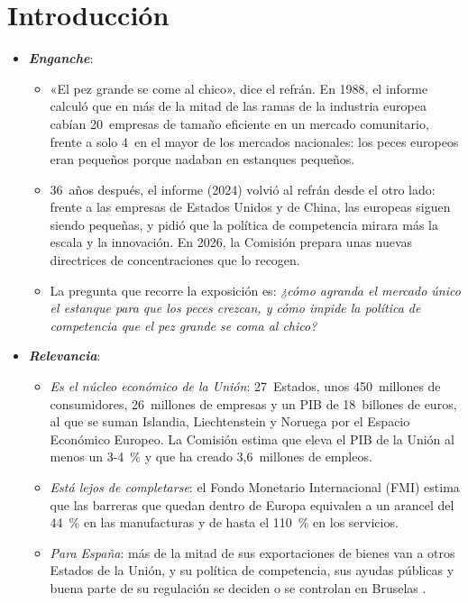 \documentclass[11pt]{article}
\begin{document}
\tceetitulo

\section*{Introducción}

\begin{itemize}
\item \textbf{\emph{Enganche}}:
  \begin{itemize}
  \item «El pez grande se come al chico», dice el refrán. En 1988, el informe  calculó que en más de la mitad de las ramas de la industria europea cabían 20~empresas de tamaño eficiente en un mercado comunitario, frente a solo 4~en el mayor de los mercados nacionales: los peces europeos eran pequeños porque nadaban en estanques pequeños\nocite{Cecchini1988Comision}.
  \item 36~años después, el informe  (2024) volvió al refrán desde el otro lado: frente a las empresas de Estados Unidos y de China, las europeas siguen siendo pequeñas, y pidió que la política de competencia mirara más la escala y la innovación\nocite{Draghi2024Future}. En 2026, la Comisión prepara unas nuevas directrices de concentraciones que lo recogen\nocite{CE2026DirectricesBorrador}.
  \item La pregunta que recorre la exposición es: \emph{¿cómo agranda el mercado único el estanque para que los peces crezcan, y cómo impide la política de competencia que el pez grande se coma al chico?}
  \end{itemize}

\item \textbf{\emph{Relevancia}}:
  \begin{itemize}
  \item \emph{Es el núcleo económico de la Unión}: 27~Estados, unos 450~millones de consumidores, 26~millones de empresas y un PIB de 18~billones de euros, al que se suman Islandia, Liechtenstein y Noruega por el Espacio Económico Europeo. La Comisión estima que eleva el PIB de la Unión al menos un 3-4~\% y que ha creado 3,6~millones de empleos\nocite{CE2025EstrategiaFicha}.
  \item \emph{Está lejos de completarse}: el Fondo Monetario Internacional (FMI) estima que las barreras que quedan dentro de Europa equivalen a un arancel del 44~\% en las manufacturas y de hasta el 110~\% en los servicios\nocite{FMI2024REO}.
  \item \emph{Para España}: más de la mitad de sus exportaciones de bienes van a otros Estados de la Unión, y su política de competencia, sus ayudas públicas y buena parte de su regulación se deciden o se controlan en Bruselas  .
  \end{itemize}


\end{itemize}
\end{document}
